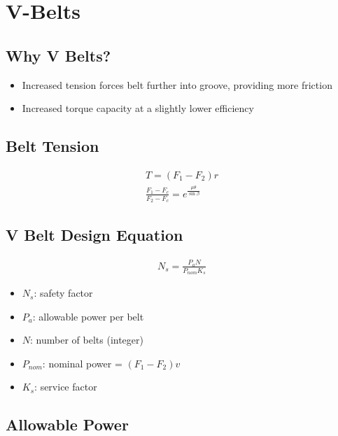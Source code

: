 \documentclass[
10pt,
a4paper,
openany,
svgnames,
]{book}
\begin{document}
\section*{V-Belts}
\label{sec:orgb2e3588}

\subsection*{Why V Belts?}
\label{sec:org4606ab0}

\begin{itemize}
\item Increased tension forces belt further into groove, providing more friction
\item Increased torque capacity at a slightly lower efficiency
\end{itemize}

\subsection*{Belt Tension}
\label{sec:orgc532091}

\begin{align*}
    T = \left( F_1 - F_2 \right) r \\
    \frac{F_1 - F_c}{F_2 - F_c} = e^{\frac{\mu \theta}{\sin \beta}}
\end{align*}

\subsection*{V Belt Design Equation}
\label{sec:org3c47e9d}

\begin{align*}
    N_s = \frac{P_a N}{P_{nom} K_s}
\end{align*}

\begin{itemize}
\item \(N_s\): safety factor
\item \(P_a\): allowable power per belt
\item \(N\): number of belts (integer)
\item \(P_{nom}\): nominal power = \((F_1 - F_2)v\)
\item \(K_s\): service factor
\end{itemize}

\subsection*{Allowable Power}
\label{sec:org3c1e3a6}
\end{document}
